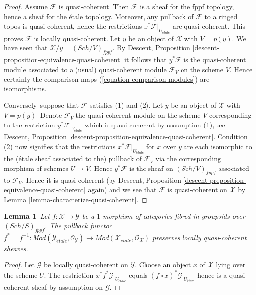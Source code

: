 \documentclass{stacks-project}
\theoremstyle{plain}
\newtheorem{lemma}[subsection]{Lemma}
\theoremstyle{definition}
\theoremstyle{remark}
\numberwithin{equation}{subsection}
\def\Sch{\mathit{Sch}}
\def\etale{{\acute{e}tale}}
\begin{document}
\begin{proof}
Assume $\mathcal{F}$ is quasi-coherent. Then $\mathcal{F}$ is a sheaf
for the fppf topology, hence a sheaf for the \'etale topology. Moreover,
any pullback of $\mathcal{F}$ to a ringed topos is quasi-coherent, hence
the restrictions $x^*\mathcal{F}|_{U_\etale}$ are quasi-coherent.
This proves $\mathcal{F}$ is locally quasi-coherent.
Let $y$ be an object of $\mathcal{X}$ with $V = p(y)$.
We have seen that $\mathcal{X}/y = (\Sch/V)_{fppf}$. By
Descent, Proposition \ref{descent-proposition-equivalence-quasi-coherent}
it follows that $y^*\mathcal{F}$ is the quasi-coherent module
associated to a (usual) quasi-coherent module $\mathcal{F}_V$ on
the scheme $V$. Hence certainly the comparison maps
(\ref{equation-comparison-modules}) are isomorphisms.

\medskip\noindent
Conversely, suppose that $\mathcal{F}$ satisfies (1) and (2).
Let $y$ be an object of $\mathcal{X}$ with $V = p(y)$. Denote
$\mathcal{F}_V$ the quasi-coherent module on
the scheme $V$ corresponding to the restriction
$y^*\mathcal{F}|_{V_\etale}$ which is quasi-coherent by
assumption (1), see
Descent, Proposition \ref{descent-proposition-equivalence-quasi-coherent}.
Condition (2) now signifies that the restrictions
$x^*\mathcal{F}|_{U_\etale}$ for $x$ over $y$ are each
isomorphic to the (\'etale sheaf associated to the) pullback of $\mathcal{F}_V$
via the corresponding morphism of schemes $U \to V$.
Hence $y^*\mathcal{F}$ is the sheaf on $(\Sch/V)_{fppf}$
associated to $\mathcal{F}_V$. Hence it is quasi-coherent (by
Descent, Proposition \ref{descent-proposition-equivalence-quasi-coherent}
again) and we see that $\mathcal{F}$ is quasi-coherent on $\mathcal{X}$ by
Lemma \ref{lemma-characterize-quasi-coherent}.
\end{proof}

\begin{lemma}
\label{lemma-pullback-lqc}
Let $f : \mathcal{X} \to \mathcal{Y}$ be a $1$-morphism of categories
fibred in groupoids over $(\Sch/S)_{fppf}$. The pullback functor
$f^* = f^{-1} :
\textit{Mod}(\mathcal{Y}_\etale, \mathcal{O}_\mathcal{Y})
\to
\textit{Mod}(\mathcal{X}_\etale, \mathcal{O}_\mathcal{X})$
preserves locally quasi-coherent sheaves.
\end{lemma}

\begin{proof}
Let $\mathcal{G}$ be locally quasi-coherent on $\mathcal{Y}$.
Choose an object $x$ of $\mathcal{X}$ lying over the scheme $U$.
The restriction $x^*f^*\mathcal{G}|_{U_\etale}$ equals
$(f \circ x)^*\mathcal{G}|_{U_\etale}$
hence is a quasi-coherent sheaf by assumption on $\mathcal{G}$.
\end{proof}
\end{document}
